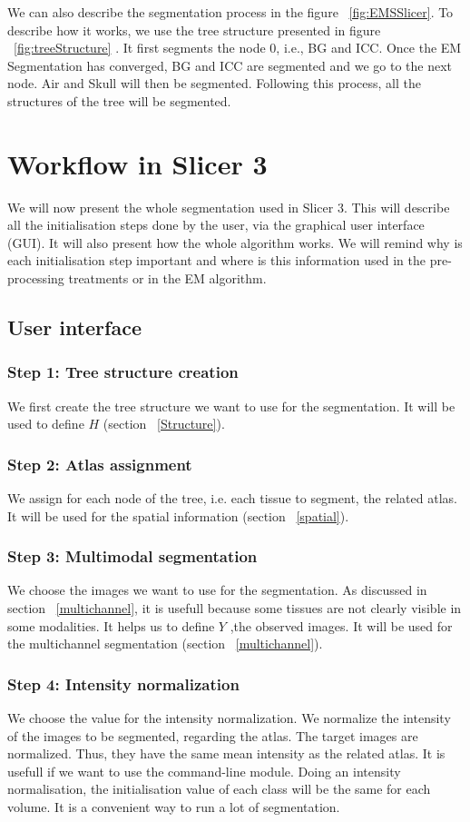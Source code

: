We can also describe the segmentation process in the figure ~\ref{fig:EMSSlicer}. To describe how it works, we use the tree structure presented in figure ~\ref{fig:treeStructure} . It first segments the node 0, i.e., BG and ICC. Once the EM Segmentation has converged, BG and ICC are segmented and we go to the next node. Air and Skull will then be segmented. Following this process, all the structures of the tree will be segmented.
%
\section{Workflow in Slicer 3}
We will now present the whole segmentation used in Slicer 3. This will describe all the initialisation steps done by the user, via the graphical user interface (GUI). It will also present how the whole algorithm works. We will remind why is each initialisation step important and where is this information used in the pre-processing treatments or in the EM algorithm.
%
\subsection{User interface}\label{GUI}
\subsubsection{Step 1: Tree structure creation}
We first create the tree structure we want to use for the segmentation. It will be used to define $H$ (section ~\ref{Structure}).
%
\subsubsection{Step 2: Atlas assignment}
We assign for each node of the tree, i.e. each tissue to segment, the related atlas. It will be used for the spatial information (section ~\ref{spatial}).
%
\subsubsection{Step 3: Multimodal segmentation}
We choose the images we want to use for the segmentation. As discussed in section ~\ref{multichannel}, it is usefull because some tissues are not clearly visible in some modalities. It helps us to define $Y$ ,the observed images. It will be used for the multichannel segmentation (section ~\ref{multichannel}).
%
\subsubsection{Step 4: Intensity normalization}
We choose the value for the intensity normalization. We normalize the intensity of the images to be segmented, regarding the atlas. The target images are normalized. Thus, they have the same mean intensity as the related atlas. It is usefull if we want to use the command-line module. Doing an intensity normalisation, the initialisation value of each class will be the same for each volume. It is a convenient way to run a lot of segmentation.
%
